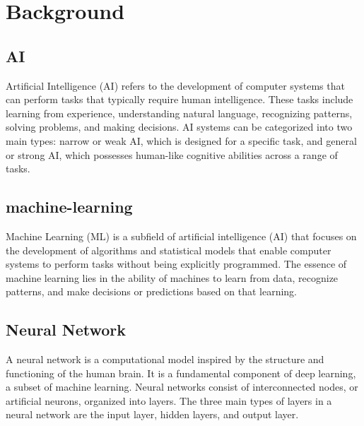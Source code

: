 \chapter{Background} %

\section{AI}
Artificial Intelligence (AI) refers to the development of computer systems that can perform tasks that typically require human intelligence. These tasks include learning from experience, understanding natural language, recognizing patterns, solving problems, and making decisions. AI systems can be categorized into two main types: narrow or weak AI, which is designed for a specific task, and general or strong AI, which possesses human-like cognitive abilities across a range of tasks.
\section{machine-learning}
Machine Learning (ML) is a subfield of artificial intelligence (AI) that focuses on the development of algorithms and statistical models that enable computer systems to perform tasks without being explicitly programmed. The essence of machine learning lies in the ability of machines to learn from data, recognize patterns, and make decisions or predictions based on that learning.
\section{Neural Network}
A neural network is a computational model inspired by the structure and functioning of the human brain. It is a fundamental component of deep learning, a subset of machine learning. Neural networks consist of interconnected nodes, or artificial neurons, organized into layers. The three main types of layers in a neural network are the input layer, hidden layers, and output layer.
